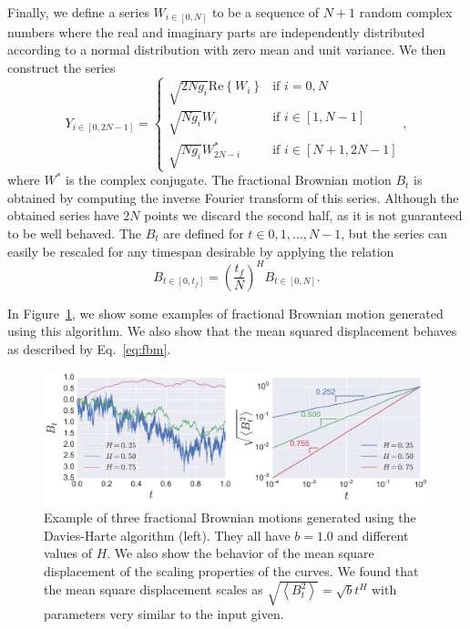 Finally, we define a series $W_{i\in[0,N]}$ to be a sequence of $N+1$ random
complex numbers where the real and imaginary parts are independently
distributed according to a normal distribution with zero mean and unit
variance. We then construct the series
\begin{equation}
    Y_{i\in[0,2N-1]}=\begin{cases}
        \sqrt{2Ng_{i}}\mbox{Re}\left\{ W_{i}\right\}  & \mbox{if } i=0,N\\
        \sqrt{Ng_{i}}W_{i} & \mbox{if } i\in\left[1, N-1\right]\\
        \sqrt{Ng_{i}}W_{2N-i}^{*} & \mbox{if } i\in\left[N+1, 2N-1\right]
    \end{cases},
\end{equation}
where $W^{*}$ is the complex conjugate. The fractional Brownian motion $B_t$ is
obtained by computing the inverse Fourier transform of this series. Although
the obtained series have $2N$ points we discard the second half, as it is not
guaranteed to be well behaved. The $B_t$ are defined for $t\in{0,1,\ldots,N-1}$,
but the series can easily be rescaled for any timespan desirable by applying
the relation
\begin{equation}
    B_{t\in[0,t_{f}]}={\left(\frac{t_{f}}{N}\right)}^{H}B_{t\in[0,N]}.
\end{equation}

In Figure~\ref{fig:fbm}, we show some examples of fractional Brownian motion
generated using this algorithm. We also show that the mean squared displacement
behaves as described by Eq.~\ref{eq:fbm}.

\begin{figure}
\begin{center}
    \includegraphics[scale=0.45]{chapters/ch6-asle/figs/fbm}
\end{center}
\caption{Example of three fractional Brownian motions generated using the
    Davies-Harte algorithm (left). They all have $b=1.0$ and different values
    of $H$. We also show the behavior of the mean square displacement of the
    scaling properties of the curves. We found that the mean square displacement
    scales as $\sqrt{\left\langle B_t^2\right\rangle}=\sqrt{b}t^H$ with
    parameters very similar to the input given.}
\label{fig:fbm}
\end{figure}


